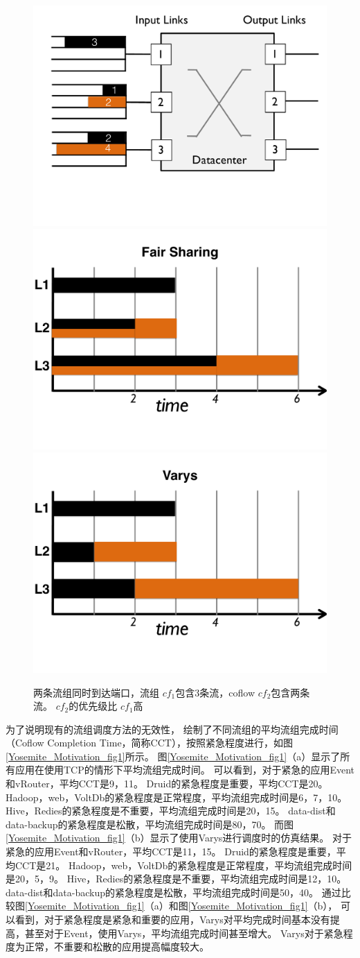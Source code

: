 \begin{figure}[h]
\centering
{}
 {\includegraphics[width=0.32\columnwidth]{figures/Yosemite/figs/motivation/motivation_color_5.pdf}}
{\includegraphics[width=0.32\columnwidth]{figures/Yosemite/figs/motivation/motivation_color_7.pdf}}
{\includegraphics[width=0.32\columnwidth]{figures/Yosemite/figs/motivation/motivation_color_6.pdf}}
\caption{两条流组同时到达端口，流组 $cf_1$包含3条流，coflow $cf_2$包含两条流。 $cf_2$的优先级比 $cf_1$高}
\label{Yosemite_Motivation_fig2}
\end{figure}

为了说明现有的流组调度方法的无效性，
绘制了不同流组的平均流组完成时间（Coflow Completion Time，简称CCT），按照紧急程度进行，如图\ref{Yosemite_Motivation_fig1}所示。
图\ref{Yosemite_Motivation_fig1}（a）显示了所有应用在使用TCP的情形下平均流组完成时间。
可以看到，对于紧急的应用Event和vRouter，平均CCT是9，11。
Druid的紧急程度是重要，平均CCT是20。
Hadoop，web，VoltDb的紧急程度是正常程度，平均流组完成时间是6，7，10。
Hive，Redies的紧急程度是不重要，平均流组完成时间是20，15。
data-dist和data-backup的紧急程度是松散，平均流组完成时间是80，70。
而图\ref{Yosemite_Motivation_fig1}（b）显示了使用Varys进行调度时的仿真结果。
对于紧急的应用Event和vRouter，平均CCT是11，15。
Druid的紧急程度是重要，平均CCT是21。
Hadoop，web，VoltDb的紧急程度是正常程度，平均流组完成时间是20，5，9。
Hive，Redies的紧急程度是不重要，平均流组完成时间是12，10。
data-dist和data-backup的紧急程度是松散，平均流组完成时间是50，40。
通过比较图\ref{Yosemite_Motivation_fig1}（a）和图\ref{Yosemite_Motivation_fig1}（b），
可以看到，对于紧急程度是紧急和重要的应用，Varys对平均完成时间基本没有提高，甚至对于Event，使用Varys，平均流组完成时间甚至增大。
Varys对于紧急程度为正常，不重要和松散的应用提高幅度较大。

